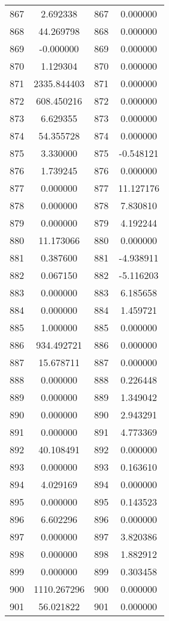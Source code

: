 \documentclass[12pt]{article}
\begin{document}
\begin{longtable}{@{}cccc@{}}
867 & 2.692338 & 867 & 0.000000 \\
868 & 44.269798 & 868 & 0.000000 \\
869 & -0.000000 & 869 & 0.000000 \\
870 & 1.129304 & 870 & 0.000000 \\
871 & 2335.844403 & 871 & 0.000000 \\
872 & 608.450216 & 872 & 0.000000 \\
873 & 6.629355 & 873 & 0.000000 \\
874 & 54.355728 & 874 & 0.000000 \\
875 & 3.330000 & 875 & -0.548121 \\
876 & 1.739245 & 876 & 0.000000 \\
877 & 0.000000 & 877 & 11.127176 \\
878 & 0.000000 & 878 & 7.830810 \\
879 & 0.000000 & 879 & 4.192244 \\
880 & 11.173066 & 880 & 0.000000 \\
881 & 0.387600 & 881 & -4.938911 \\
882 & 0.067150 & 882 & -5.116203 \\
883 & 0.000000 & 883 & 6.185658 \\
884 & 0.000000 & 884 & 1.459721 \\
885 & 1.000000 & 885 & 0.000000 \\
886 & 934.492721 & 886 & 0.000000 \\
887 & 15.678711 & 887 & 0.000000 \\
888 & 0.000000 & 888 & 0.226448 \\
889 & 0.000000 & 889 & 1.349042 \\
890 & 0.000000 & 890 & 2.943291 \\
891 & 0.000000 & 891 & 4.773369 \\
892 & 40.108491 & 892 & 0.000000 \\
893 & 0.000000 & 893 & 0.163610 \\
894 & 4.029169 & 894 & 0.000000 \\
895 & 0.000000 & 895 & 0.143523 \\
896 & 6.602296 & 896 & 0.000000 \\
897 & 0.000000 & 897 & 3.820386 \\
898 & 0.000000 & 898 & 1.882912 \\
899 & 0.000000 & 899 & 0.303458 \\
900 & 1110.267296 & 900 & 0.000000 \\
901 & 56.021822 & 901 & 0.000000 \\

\end{longtable}
\end{document}
